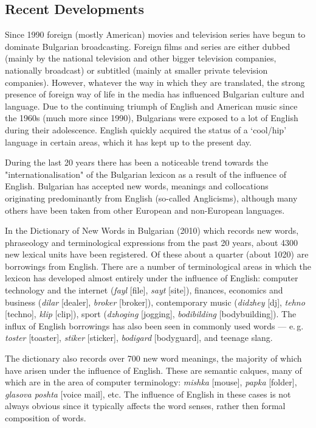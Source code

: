 \documentclass[]{../../metanetpaper}
\begin{document}
\begin{multicols}{2}
\subsection{Recent Developments}

Since 1990 foreign (mostly American) movies and television series have begun to dominate Bulgarian broadcasting. Foreign films and series are either dubbed (mainly by the national television and other bigger television companies, nationally broadcast) or subtitled (mainly at smaller private television companies). However, whatever the way in which they are translated, the strong presence of foreign way of life in the media has influenced Bulgarian culture and language. Due to the continuing triumph of English and American music since the 1960s (much more since 1990), Bulgarians were exposed to a lot of English during their adolescence. English quickly acquired the status of a ‘cool/hip’ language in certain areas, which it has kept up to the present day. 

During the last 20 years there has been a noticeable trend towards the "internationalisation" of the Bulgarian lexicon as a result of the influence of English. Bulgarian has accepted new words, meanings and collocations originating predominantly from English (so-called Anglicisms), although many others have been taken from other European and non-European languages.


In the Dictionary of New Words in Bulgarian (2010)  \cite{NWDict} which records new words, phraseology and terminological expressions from the past 20 years, about 4300 new lexical units have been registered. Of these about a quarter (about 1020) are borrowings from English. There are a number of terminological areas in which the lexicon has developed almost entirely under the influence of English: computer technology and the internet (\textit{{fayl}} [file], \textit{{sayt}} [site]), finances, economics and business (\textit{{dilar}} [dealer], \textit{{broker}} [broker]), contemporary music (\textit{{didzhey}} [dj], \textit{{tehno}} [techno], \textit{{klip}} [clip]), sport (\textit{{dzhoging}} [jogging], \textit{{bodibilding}} [bodybuilding]). The influx of English borrowings has also been seen in commonly used words — e.\,g. \textit{{toster}} [toaster], \textit{{stiker}} [sticker], \textit{{bodigard}} [bodyguard], and teenage slang.

The dictionary also records over 700 new word meanings, the majority of which have arisen under the influence of English. These are semantic calques, many of which are in the area of computer terminology: \textit{{mishka}} [mouse], \textit{{papka}} [folder], \textit{{glasova poshta}} [voice mail], etc. The influence of English in these cases is not always obvious since it typically affects the word senses, rather then formal composition of words. 


\end{multicols}
\end{document}

